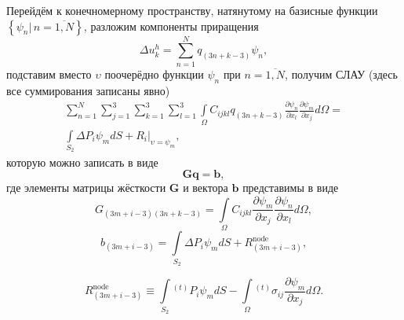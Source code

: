 Перейдём к конечномерному пространству, натянутому на базисные функции $\left\lbrace\psi_{n}|\,n=\overline{1,N}\right\rbrace$, разложим компоненты приращения
\begin{equation}
\Delta u_k^h=\sum_{n=1}^{N}q_{(3n+k-3)}\psi_n,
\label{F:F_alg_var2}
\end{equation}
подставим вместо $\upsilon$ поочерёдно функции $\psi_{n}$ при $n=\overline{1,N}$, получим СЛАУ (здесь все суммирования записаны явно)
\begin{equation}
\begin{gathered}
\sum_{n=1}^{N}\sum_{j=1}^{3}\sum_{k=1}^{3}\sum_{l=1}^{3}
\int\limits_{\Omega}{C}_{ijkl}q_{(3n+k-3)} \frac{\partial \psi_{n}}{\partial x_{l}} \frac{\partial\psi_{m}}{\partial x_j}d\Omega= \\
\int\limits_{S_{2}}\Delta P_{i}\psi_{m} dS
+\left.R_{i}\right|_{\upsilon=\psi_{m}},
\end{gathered}
\label{F:F_alg_slau1}
\end{equation}
которую можно записать в виде
\begin{equation}
\mathbf{Gq}=\mathbf{b},
\label{F:F_slau2}
\end{equation}
где элементы матрицы жёсткости $\mathbf{G}$ и вектора $\mathbf{b}$ представимы в виде
\begin{equation}
G_{(3m+i-3)(3n+k-3)}=\int\limits_{\Omega}{C}_{ijkl}\frac{\partial\psi_{m}}{\partial x_j}\frac{\partial \psi_{n}}{\partial x_{l}}d\Omega,
\label{F:F_slau3}
\end{equation}
\begin{equation}
b_{(3m+i-3)}=
\int\limits_{S_{2}}\Delta P_{i}\psi_{m} dS
+R_{(3m+i-3)}^{\mathrm{node}},
\label{F:F_slau4}
\end{equation}

\begin{equation}
R_{(3m+i-3)}^{\mathrm{node}} \equiv \int\limits_{S_{2}}{}^{(t)}P_{i} \psi_{m} dS - \int\limits_{\Omega}{}^{(t)}\sigma_{ij}\frac{\partial\psi_{m}}{\partial x_j} d\Omega.
\label{F:F_slau4_add}
\end{equation}

